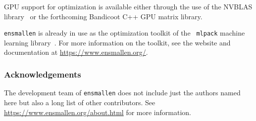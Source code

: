 \documentclass{article}
\begin{document}
GPU support for optimization is available either through the use of the NVBLAS
library~\cite{nvidia2015} or the forthcoming Bandicoot C++ GPU matrix library.

{\tt ensmallen} is already in use as the optimization toolkit of the {\tt
mlpack} machine learning library~\cite{mlpack2018}.  For more information on the
toolkit, see the website and documentation at \url{https://www.ensmallen.org/}.

\subsubsection*{Acknowledgements}

The development team of {\tt ensmallen} does not include just the authors named
here but also a long list of other contributors.  See
\url{https://www.ensmallen.org/about.html} for more information.



\end{document}
